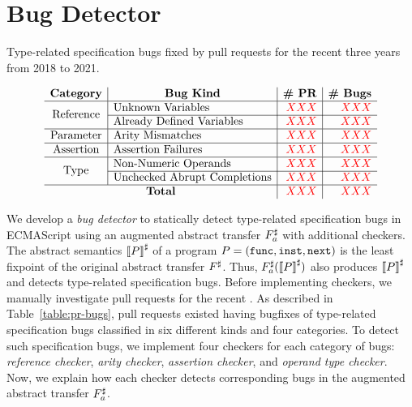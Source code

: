 \section{Bug Detector}\label{sec:checker}

\begin{table}
  \centering
  \caption{Type-related specification bugs fixed by pull requests for the recent
  three years from 2018 to 2021.}
  \label{table:pr-bugs}
  \vspace*{-1.5em}
  \[
    \begin{array}{c|l|r|r}
      \multicolumn{1}{c}{\textbf{Category}} &
      \multicolumn{1}{|c}{\textbf{Bug Kind}} &
      \multicolumn{1}{|c}{\textbf{\# PR}} &
      \multicolumn{1}{|c}{\textbf{\# Bugs}}\\
      \hline

      \multirow{2}{*}{\text{Reference}}
      & \text{Unknown Variables} & \inred{XXX} & \inred{XXX}\\\cline{2-4}
      & \text{Already Defined Variables} & \inred{XXX} & \inred{XXX}\\\hline

      \multirow{1}{*}{\text{Parameter}}
      & \text{Arity Mismatches} & \inred{XXX} & \inred{XXX}\\\hline

      \multirow{1}{*}{\text{Assertion}}
      & \text{Assertion Failures} & \inred{XXX} & \inred{XXX}\\\hline

      \multirow{2}{*}{\text{Type}}
      & \text{Non-Numeric Operands} & \inred{XXX} & \inred{XXX}\\\cline{2-4}
      & \text{Unchecked Abrupt Completions} & \inred{XXX} & \inred{XXX}\\\hline

      \multicolumn{2}{c|}{\textbf{Total}} & \inred{XXX} & \inred{XXX}\\

    \end{array}
  \]
  \vspace*{-1.5em}
\end{table}

We develop a \textit{bug detector} to statically detect type-related
specification bugs in ECMAScript using an augmented abstract transfer
${F}^\sharp_a$ with additional checkers.  The abstract semantics ${\llbracket{P}\rrbracket}^\sharp$ of
a program $P = (\mathtt{func}, \mathtt{inst}, \mathtt{next})$ is the least fixpoint of the
original abstract transfer ${F}^\sharp$.  Thus, ${F}^\sharp_a({\llbracket{P}\rrbracket}^\sharp)$ also
produces ${\llbracket{P}\rrbracket}^\sharp$ and detects type-related specification bugs.  Before
implementing checkers, we manually investigate pull requests for the recent
.  As described in
Table~\ref{table:pr-bugs},  pull requests existed having bugfixes of
 type-related specification bugs classified in six different kinds
and four categories.  To detect such specification bugs, we implement four
checkers for each category of bugs: \textit{reference checker}, \textit{arity
checker}, \textit{assertion checker}, and \textit{operand type checker}.  Now,
we explain how each checker detects corresponding bugs in the augmented abstract
transfer ${F}^\sharp_a$.


